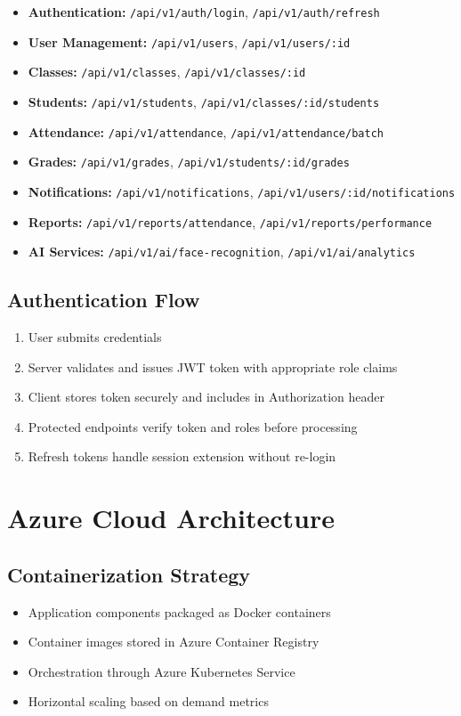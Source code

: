 \documentclass[11pt]{report}
\begin{document}
\begin{itemize}
    \item \textbf{Authentication:} \texttt{/api/v1/auth/login}, \texttt{/api/v1/auth/refresh}
    \item \textbf{User Management:} \texttt{/api/v1/users}, \texttt{/api/v1/users/:id}
    \item \textbf{Classes:} \texttt{/api/v1/classes}, \texttt{/api/v1/classes/:id}
    \item \textbf{Students:} \texttt{/api/v1/students}, \texttt{/api/v1/classes/:id/students}
    \item \textbf{Attendance:} \texttt{/api/v1/attendance}, \texttt{/api/v1/attendance/batch}
    \item \textbf{Grades:} \texttt{/api/v1/grades}, \texttt{/api/v1/students/:id/grades}
    \item \textbf{Notifications:} \texttt{/api/v1/notifications}, \texttt{/api/v1/users/:id/notifications}
    \item \textbf{Reports:} \texttt{/api/v1/reports/attendance}, \texttt{/api/v1/reports/performance}
    \item \textbf{AI Services:} \texttt{/api/v1/ai/face-recognition}, \texttt{/api/v1/ai/analytics}
\end{itemize}

\subsection{Authentication Flow}
\begin{enumerate}
    \item User submits credentials
    \item Server validates and issues JWT token with appropriate role claims
    \item Client stores token securely and includes in Authorization header
    \item Protected endpoints verify token and roles before processing
    \item Refresh tokens handle session extension without re-login
\end{enumerate}

\section{Azure Cloud Architecture}

\subsection{Containerization Strategy}
\begin{itemize}
    \item Application components packaged as Docker containers
    \item Container images stored in Azure Container Registry
    \item Orchestration through Azure Kubernetes Service
    \item Horizontal scaling based on demand metrics
\end{itemize}
\end{document}
